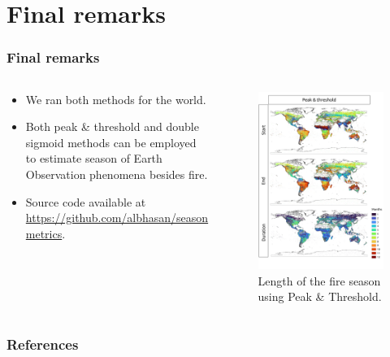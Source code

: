 \documentclass[aspectratio=169]{beamer}
\begin{document}
\section{Final remarks}

\begin{frame}
    \frametitle{Final remarks}
    \begin{columns}
        \begin{column}{0.5\linewidth}
            \begin{itemize}
                \item We ran both methods for the world.
                \item Both peak \& threshold and double sigmoid methods can be
                    employed to estimate season of Earth Observation phenomena 
                    besides fire.
                \item Source code available at
                    \url{https://github.com/albhasan/seasonmetrics}.
            \end{itemize}
        \end{column}
        \begin{column}{0.5\linewidth}
            \begin{figure}[h]
                \includegraphics[width=0.77\linewidth]
                {./images/pthres_world.png}
                \caption{Length of the fire season using Peak \& Threshold.}
            \end{figure}
        \end{column}
    \end{columns}
\end{frame}

\begin{frame}[allowframebreaks]
    \frametitle{References}
    
    
\end{frame}
\end{document}
